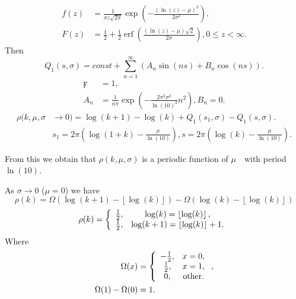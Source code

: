 \documentclass[titlepage,fleqn]{article}%
\begin{document}
\label{LogNormDist}%
\begin{align*}
f(z)  &  =\frac{1}{\sigma z\sqrt{2\pi}}\exp\left(  -\frac{\left(  \ln
(z)-\mu\right)  ^{2}}{2\sigma^{2}}\right)  ,\\
F(z)  &  =\frac{1}{2}+\frac{1}{2}\operatorname{erf}\left(  \frac{\left(
\ln(z)-\mu\right)  \sqrt{2}}{2\sigma}\right)  ,0\leq z<\infty.
\end{align*}
Then%
\begin{equation}
Q_{1}\left(  s,\sigma\right)  =const+%
{\displaystyle\sum\limits_{n=1}^{\infty}}
\left(  A_{n}\sin\left(  ns\right)  +B_{n}\cos\left(  ns\right)  \right)  .
\label{LogNorm1}%
\end{equation}%
\begin{align*}
\digamma &  =1,\\
A_{n}  &  =\frac{1}{n\pi}\exp\left(  -\frac{2\pi^{2}\sigma^{2}}{\ln(10)^{2}%
}n^{2}\right)  ,B_{n}=0.
\end{align*}%
\begin{align}
\rho(k,\mu,\sigma &  \rightarrow0)=\log(k+1)-\log(k)+Q_{1}\left(  s_{1}%
,\sigma\right)  -Q_{1}\left(  s,\sigma\right)  .\label{LogNorm2}\\
&  s_{1}=2\pi\left(  \log(1+k)-\frac{\mu}{\ln(10)}\right)  ,s=2\pi\left(
\log(k)-\frac{\mu}{\ln(10)}\right)  .\nonumber
\end{align}


From this we obtain that $\rho(k,\mu,\sigma)$ is a periodic function of $\mu
$\ \ with period $\ln(10).$

\bigskip As $\sigma\rightarrow0$ ($\mu=0$) we have%
\[
\rho(k)=\Omega(\log(k+1)-\left\lfloor \log(k)\right\rfloor )-\Omega
(\log(k)-\left\lfloor \log(k)\right\rfloor )
\]%
\[
\rho(k)=\left\{
\begin{array}
[c]{cc}%
\frac{1}{2}, & \log(k)=\left\lfloor \log(k)\right\rfloor ,\\
\frac{1}{2}, & \log(k+1)=\left\lfloor \log(k)\right\rfloor +1.
\end{array}
\right.
\]
Where%
\begin{align*}
\Omega(x)  &  =\left\{
\begin{array}
[c]{cc}%
-\frac{1}{2}, & x=0,\\
\frac{1}{2}, & x=1,\\
0, & \text{other}.
\end{array}
\right.  ,\\
\Omega(1)-\Omega(0)  &  =1.
\end{align*}
\end{document}
